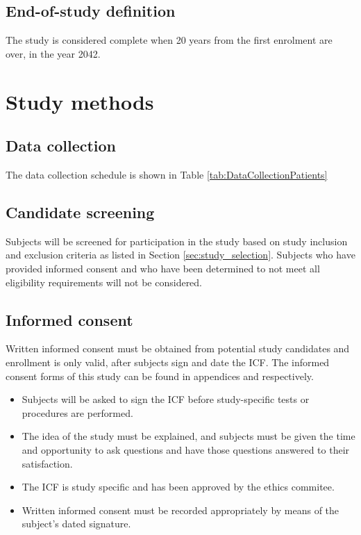\subsection{End-of-study definition}
The study is considered complete when 20 years from the first enrolment are over, in the year 2042.

\section{Study methods}
\subsection{Data collection}
The data collection schedule is shown in Table \ref{tab:DataCollectionPatients}



\subsection{Candidate screening}
\label{subsec:screening}
Subjects will be screened for participation in the study based on study inclusion and exclusion criteria as listed in Section \ref{sec:study_selection}. Subjects who have provided informed consent and who have been determined to not meet all eligibility requirements will not be considered.

\subsection{Informed consent}
Written informed consent must be obtained from potential study candidates and enrollment is only valid, after subjects sign and date the \ac{ICF}. The informed consent forms of this study can be found in appendices \label{sec:icf_patient} and \label{sec:icf_relative} respectively.

\begin{itemize}[noitemsep, topsep=0pt]
\item Subjects will be asked to sign the \ac{ICF} before study-specific tests or procedures are performed.
\item The idea of the study must be explained, and subjects must be given the time and opportunity to ask questions and have those questions answered to their satisfaction.
\item The \ac{ICF} is study specific and has been approved by the ethics commitee.
\item Written informed consent must be recorded appropriately by means of the subject’s dated signature.
\end{itemize}

